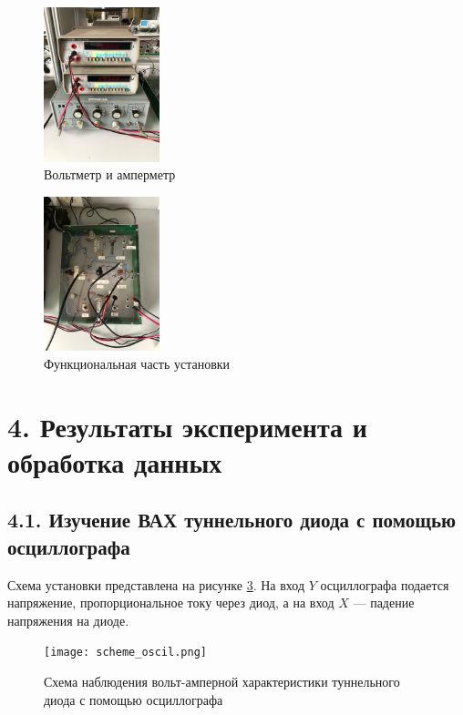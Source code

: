 \documentclass[a4paper,12pt]{report}
\begin{document}
\begin{figure}[H]
    \centering	
    \includegraphics[width=0.3\textwidth]{2.jpg}
    \caption{Вольтметр и амперметр}
    \label{pic2}
\end{figure}

\begin{figure}[H]
    \centering	
    \includegraphics[width=0.3\textwidth]{1.jpg}
    \caption{Функциональная часть установки}
    \label{pic1}
\end{figure}

\section*{4. Результаты эксперимента и обработка данных}
\subsection*{4.1. Изучение ВАХ туннельного диода с помощью осциллографа}

Схема установки представлена на рисунке \ref{pic:scheme_oscil}. На вход $ Y $ осциллографа подается напряжение, пропорциональное току через диод, а на вход $ X $ --- падение напряжения на диоде.
	
\begin{figure}[H]
    \centering	
    \texttt{[image: scheme\_oscil.png]}
    \caption{Схема наблюдения вольт-амперной характеристики туннельного диода с помощью осциллографа}
    \label{pic:scheme_oscil}
\end{figure}
	
\end{document}
